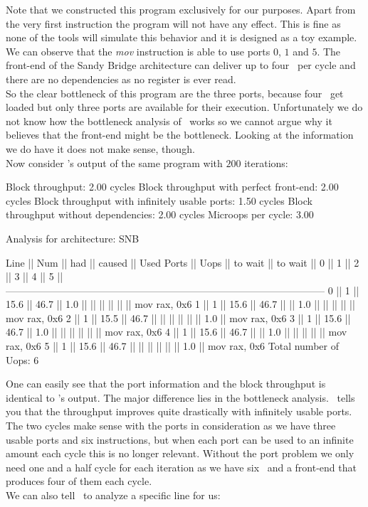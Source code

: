 Note that we constructed this program exclusively for our purposes. Apart from the very first instruction the program will not have any effect. This is fine as none of the tools will simulate this behavior and it is designed as a toy example.\\
We can observe that the \emph{mov} instruction is able to use ports $0$, $1$ and $5$. The front-end of the Sandy Bridge architecture can deliver up to four \microops\ per cycle and there are no dependencies as no register is ever read.\\
So the clear bottleneck of this program are the three ports, because four \microops\ get loaded but only three ports are available for their execution. Unfortunately we do not know how the bottleneck analysis of \iaca\ works so we cannot argue why it believes that the front-end might be the bottleneck. Looking at the information we do have it does not make sense, though.\\


Now consider \suaca's output of the same program with $200$ iterations:

\begin{example}
Block throughput: 2.00 cycles
Block throughput with perfect front-end: 2.00 cycles
Block throughput with infinitely usable ports: 1.50 cycles
Block throughput without dependencies: 2.00 cycles
Microops per cycle: 3.00
       
Analysis for architecture: SNB
        
 Line  ||   Num   ||   had   || caused  ||            Used Ports
       ||   Uops  || to wait || to wait ||   0   ||   1   ||   2   ||   3   ||   4   ||   5   ||
 ------------------------------------------------------------------------------------------------
   0   ||    1    ||  15.6   ||  46.7   ||  1.0  ||       ||       ||       ||       ||       || mov rax, 0x6
   1   ||    1    ||  15.6   ||  46.7   ||       ||  1.0  ||       ||       ||       ||       || mov rax, 0x6
   2   ||    1    ||  15.5   ||  46.7   ||       ||       ||       ||       ||       ||  1.0  || mov rax, 0x6
   3   ||    1    ||  15.6   ||  46.7   ||  1.0  ||       ||       ||       ||       ||       || mov rax, 0x6
   4   ||    1    ||  15.6   ||  46.7   ||       ||  1.0  ||       ||       ||       ||       || mov rax, 0x6
   5   ||    1    ||  15.6   ||  46.7   ||       ||       ||       ||       ||       ||  1.0  || mov rax, 0x6
Total number of Uops: 6
\end{example}

One can easily see that the port information and the block throughput is identical to \iaca's output. The major difference lies in the bottleneck analysis. \suaca\ tells you that the throughput improves quite drastically with infinitely usable ports. The two cycles make sense with the ports in consideration as we have three usable ports and six instructions, but when each port can be used to an infinite amount each cycle this is no longer relevant. Without the port problem we only need one and a half cycle for each iteration as we have six \microops\ and a front-end that produces four of them each cycle.\\
We can also tell \suaca\ to analyze a specific line for us:


